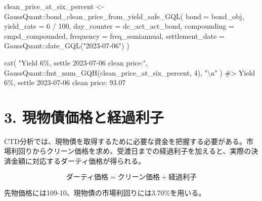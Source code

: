 \documentclass[
  letterpaper,
  DIV=11,
  numbers=noendperiod]{scrreprt}
\newenvironment{Shaded}{\begin{snugshade}}{\end{snugshade}}
\newcommand{\AttributeTok}[1]{\textcolor[rgb]{0.40,0.45,0.13}{#1}}
\newcommand{\CommentTok}[1]{\textcolor[rgb]{0.37,0.37,0.37}{#1}}
\newcommand{\DecValTok}[1]{\textcolor[rgb]{0.68,0.00,0.00}{#1}}
\newcommand{\FunctionTok}[1]{\textcolor[rgb]{0.28,0.35,0.67}{#1}}
\newcommand{\NormalTok}[1]{\textcolor[rgb]{0.00,0.23,0.31}{#1}}
\newcommand{\OtherTok}[1]{\textcolor[rgb]{0.00,0.23,0.31}{#1}}
\newcommand{\SpecialCharTok}[1]{\textcolor[rgb]{0.37,0.37,0.37}{#1}}
\newcommand{\StringTok}[1]{\textcolor[rgb]{0.13,0.47,0.30}{#1}}
\begin{document}
\begin{Shaded}
\begin{Highlighting}[]
\NormalTok{clean\_price\_at\_six\_percent }\OtherTok{\textless{}{-}}\NormalTok{ GaussQuant}\SpecialCharTok{::}\FunctionTok{bond\_clean\_price\_from\_yield\_safe\_GQL}\NormalTok{(}
  \AttributeTok{bond =}\NormalTok{ bond\_obj,}
  \AttributeTok{yield\_rate =} \DecValTok{6} \SpecialCharTok{/} \DecValTok{100}\NormalTok{,}
  \AttributeTok{day\_counter =}\NormalTok{ dc\_act\_act\_bond,}
  \AttributeTok{compounding =}\NormalTok{ cmpd\_compounded,}
  \AttributeTok{frequency =}\NormalTok{ freq\_semiannual,}
  \AttributeTok{settlement\_date =}\NormalTok{ GaussQuant}\SpecialCharTok{::}\FunctionTok{date\_GQL}\NormalTok{(}\StringTok{"2023{-}07{-}06"}\NormalTok{)}
\NormalTok{)}

\FunctionTok{cat}\NormalTok{(}
  \StringTok{"Yield 6\%, settle 2023{-}07{-}06 clean price:"}\NormalTok{,}
\NormalTok{  GaussQuant}\SpecialCharTok{::}\FunctionTok{fmt\_num\_GQH}\NormalTok{(clean\_price\_at\_six\_percent, }\DecValTok{4}\NormalTok{),}
  \StringTok{"}\SpecialCharTok{\textbackslash{}n}\StringTok{"}
\NormalTok{)}
\CommentTok{\#\textgreater{} Yield 6\%, settle 2023{-}07{-}06 clean price: 93.07}
\end{Highlighting}
\end{Shaded}

\section{3.
現物債価格と経過利子}\label{ux73feux7269ux50b5ux4fa1ux683cux3068ux7d4cux904eux5229ux5b50}

CTD分析では、現物債を取得するために必要な資金を把握する必要がある。市場利回りからクリーン価格を求め、受渡日までの経過利子を加えると、実際の決済金額に対応するダーティ価格が得られる。

\[
\text{ダーティ価格}
=
\text{クリーン価格}
+
\text{経過利子}
\]

先物価格には109-10、現物債の市場利回りには3.70\%を用いる。
\end{document}
